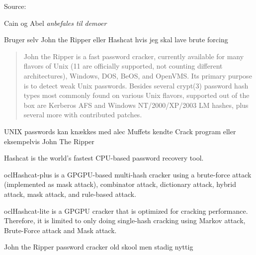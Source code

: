 \documentclass[20pt,landscape,a4paper,footrule]{foils}
\begin{document}
Source:\\
{\small{}
}




\begin{list1}
\item Cain og Abel \emph{anbefales til demoer}  
\item Bruger selv John the Ripper eller Hashcat hvis jeg skal lave brute forcing
\end{list1}


\begin{quote}
John the Ripper is a fast password cracker, currently available for
many flavors of Unix (11 are officially supported, not counting
different architectures), Windows, DOS, BeOS, and OpenVMS. Its primary
purpose is to detect weak Unix passwords. Besides several crypt(3)
password hash types most commonly found on various Unix flavors,
supported out of the box are Kerberos AFS and Windows NT/2000/XP/2003
LM hashes, plus several more with contributed patches.
\end{quote}

\begin{list1}
\item UNIX passwords kan knækkes med alec Muffets kendte Crack program
  eller eksempelvis John The Ripper 
\end{list1}




\begin{list2}
\item Hashcat is the world's fastest CPU-based password recovery tool.
\item oclHashcat-plus is a GPGPU-based multi-hash cracker using a brute-force attack (implemented as mask attack), combinator attack, dictionary attack, hybrid attack, mask attack, and rule-based attack.
\item oclHashcat-lite is a GPGPU cracker that is optimized for cracking performance. Therefore, it is limited to only doing single-hash cracking using Markov attack, Brute-Force attack and Mask attack.
\item John the Ripper password cracker old skool men stadig nyttig
\end{list2}
\end{document}
